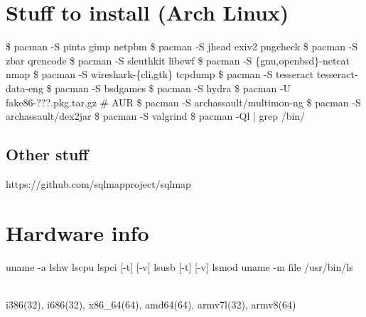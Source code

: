 \documentclass{refcard}
\begin{document}
\section{Stuff to install \hfill {\normalsize (Arch Linux)}}



\begin{ldesc}
	  \$ pacman -S pinta gimp netpbm
	    \$ pacman -S jhead exiv2 pngcheck
	\li[QR/Barcode]        \$ pacman -S zbar qrencode
	        \$ pacman -S sleuthkit libewf
	    \$ pacman -S \{gnu,openbsd\}-netcat nmap
	    \$ pacman -S wireshark-\{cli,gtk\} tcpdump
	\li[OCR]               \$ pacman -S tesseract tesseract-data-eng %
	\li[En/Decoding]       \$ pacman -S bsdgames
	  \$ pacman -S hydra
	\li[8086 emulator] \$ pacman -U fake86-???.pkg.tar.gz  \# AUR
	        \$ pacman -S archassault/multimon-ng
	\li[Android]           \$ pacman -S archassault/dex2jar
	\li[Valgrind]          \$ pacman -S valgrind
	   \$ pacman -Ql  | grep /bin/
\end{ldesc}

\subsection{Other stuff}
\begin{ldesc}
	\lI[SQLi]     https://github.com/sqlmapproject/sqlmap
\end{ldesc}

\section{Hardware info}

\begin{ldesc}
	 uname -a
	 lshw
	 lscpu
	 lspci [-t] [-v]
	 lsusb [-t] [-v]
	 lsmod
	 uname -m
	 file /usr/bin/ls
\end{ldesc}\\[1ex]
{\centering
i386(32), i686(32), x86\_64(64), amd64(64), armv7l(32), armv8(64)}
\end{document}
